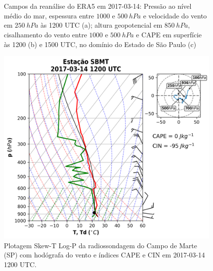 \begin{figure}[htb]
	\begin{center}
		\caption{Campos da reanálise do ERA5 em 2017-03-14: Pressão ao nível médio do mar, espessura entre $1000$ e $500\:hPa$ e velocidade do vento em $250\:hPa$ às 1200 UTC (a); altura geopotencial em $850\:hPa$, cisalhamento do vento entre $1000$ e $500\:hPa$ e CAPE em superfície às 1200 (b) e 1500 UTC, no domínio do Estado de São Paulo (c)} 
		\label{era5_20170314_main}
		 \\
		 \\
	\end{center}
\end{figure}

\begin{figure}[hp]
	\begin{center}
		\caption{Plotagem Skew-T Log-P da radiossondagem do Campo de Marte (SP) com hodógrafa do vento e índices CAPE e CIN em 2017-03-14 1200 UTC.} 
		\label{sondagem_20170314}
		\includegraphics[width=0.75\columnwidth]{../Sounding_Processing/figures/sounding_SBMT2017031412UTC_ptbr.png}
	\end{center}
\end{figure}

